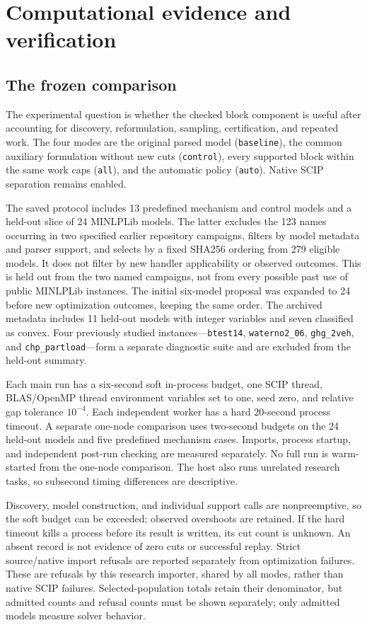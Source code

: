 \section{Computational evidence and verification}\label{sec:evidence}

\subsection{The frozen comparison}

The experimental question is whether the checked block component is
useful after accounting for discovery, reformulation, sampling,
certification, and repeated work. The four modes are the original
parsed model (\texttt{baseline}), the common auxiliary formulation
without new cuts (\texttt{control}), every supported block within the
same work caps (\texttt{all}), and the automatic policy
(\texttt{auto}). Native SCIP separation remains enabled.

The saved protocol includes 13 predefined mechanism and control
models and a held-out slice of 24 MINLPLib models. The latter excludes
the 123 names occurring in two specified earlier repository campaigns,
filters by model metadata and parser support, and selects by a fixed
SHA256 ordering from 279 eligible models. It does not filter by new
handler applicability or observed outcomes. This is held out from the
two named campaigns, not from every possible past use of public
MINLPLib instances. The initial six-model proposal was expanded to
24 before new optimization outcomes, keeping the same order.
The archived metadata includes 11 held-out models with integer
variables and seven classified as convex. Four previously studied
instances---\texttt{btest14}, \texttt{waterno2\_06},
\texttt{ghg\_2veh}, and \texttt{chp\_partload}---form a separate
diagnostic suite and are excluded from the held-out summary.

Each main run has a six-second soft in-process budget, one SCIP thread,
BLAS/OpenMP thread environment variables set to one, seed zero,
and relative gap tolerance
$10^{-4}$. Each independent worker has a hard 20-second process
timeout. A separate one-node comparison uses two-second budgets on
the 24 held-out models and five predefined mechanism cases. Imports,
process startup, and independent post-run checking are measured
separately. No full run is warm-started from the one-node comparison.
The host also runs unrelated research tasks, so subsecond timing
differences are descriptive.

Discovery, model construction, and individual support calls are
nonpreemptive, so the soft budget can be exceeded; observed overshoots
are retained. If the hard timeout kills a process before its result is
written, its cut count is unknown. An absent record is not evidence of
zero cuts or successful replay. Strict source/native import refusals
are reported separately from optimization failures. These are refusals
by this research importer, shared by all modes, rather than native
SCIP failures. Selected-population totals retain their denominator,
but admitted counts and refusal counts must be shown separately;
only admitted models measure solver behavior.

